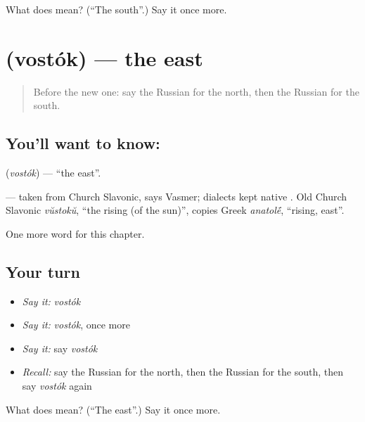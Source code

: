 \begin{tcolorbox}[breakable,colback=teal!4,colframe=teal!35!black,title={Before you move on}]
What does  mean? (\textquotedblleft{}The south\textquotedblright{}.) Say it once more.
\end{tcolorbox}
\section[\texorpdfstring{\ru{восток} (vostók)}{восток (vostók)}]{ (vostók) — the east}

\label{lesson:RU-C90-east}



\begin{quote}
Before the new one: say the Russian for the north, then the Russian for the south.
\end{quote}

\subsection*{You'll want to know: }
\textbf{} (\emph{vostók}) — \textquotedblleft{}the east\textquotedblright{}.

\begin{cousinweb}
\textbf{} — taken from Church Slavonic, says Vasmer; dialects kept native \emph{}. Old Church Slavonic \emph{vŭstokŭ}, \textquotedblleft{}the rising (of the sun)\textquotedblright{}, copies Greek \emph{anatol\'{\={e}}}, \textquotedblleft{}rising, east\textquotedblright{}.
\end{cousinweb}

\begin{grammarlens}[title={What you've built}]
One more word for this chapter.
\end{grammarlens}

\subsection*{Your turn}
\begin{itemize}
\raggedright
  \item \emph{Say it:} \emph{vostók}
  \item \emph{Say it:} \emph{vostók}, once more
  \item \emph{Say it:} say \emph{vostók}
  \item \emph{Recall:} say the Russian for the north, then the Russian for the south, then say \emph{vostók} again
\end{itemize}

\begin{tcolorbox}[breakable,colback=teal!4,colframe=teal!35!black,title={Before you move on}]
What does  mean? (\textquotedblleft{}The east\textquotedblright{}.) Say it once more.
\end{tcolorbox}
